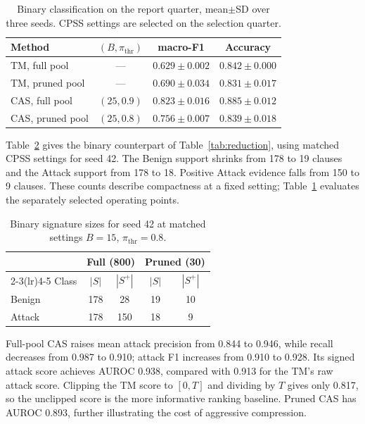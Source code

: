 \documentclass[conference]{IEEEtran}
\begin{document}
\begin{table}[!htb]
\color{blue}
\centering
\caption{Binary classification on the report quarter, mean$\pm$SD
over three seeds. CPSS settings are selected on the selection quarter.}
\label{tab:binary}
\footnotesize
\setlength{\tabcolsep}{3pt}
\begin{tabular}{@{}lccc@{}}
\toprule
Method & $(B,\pi_{\mathrm{thr}})$ & macro-F1 & Accuracy \\
\midrule
TM, full pool & --- & $0.629\pm0.002$ & $0.842\pm0.000$ \\
TM, pruned pool & --- & $0.690\pm0.034$ & $0.831\pm0.017$ \\
CAS, full pool & $(25,0.9)$ & $\mathbf{0.823\pm0.016}$ & $\mathbf{0.885\pm0.012}$ \\
CAS, pruned pool & $(25,0.8)$ & $0.756\pm0.007$ & $0.839\pm0.018$ \\
\bottomrule
\end{tabular}
\end{table}

Table~\ref{tab:binary-reduction} gives the binary counterpart of
Table~\ref{tab:reduction}, using matched CPSS settings for seed 42.
The Benign support shrinks from 178 to 19 clauses and the Attack
support from 178 to 18. Positive Attack evidence falls from 150 to
9 clauses. These counts describe compactness at a fixed setting;
Table~\ref{tab:binary} evaluates the separately selected operating points.

\begin{table}[!htb]
\color{blue}
\centering
\caption{Binary signature sizes for seed 42 at matched settings
$B=15$, $\pi_{\mathrm{thr}}=0.8$.}
\label{tab:binary-reduction}
\footnotesize
\begin{tabular}{@{}lcccc@{}}
\toprule
& \multicolumn{2}{c}{Full (800)} & \multicolumn{2}{c}{Pruned (30)} \\
\cmidrule(lr){2-3}\cmidrule(lr){4-5}
Class & $|S|$ & $|S^+|$ & $|S|$ & $|S^+|$ \\
\midrule
Benign & 178 & 28 & 19 & 10 \\
Attack & 178 & 150 & 18 & 9 \\
\bottomrule
\end{tabular}
\end{table}

Full-pool CAS raises mean attack precision from 0.844 to 0.946,
while recall decreases from 0.987 to 0.910; attack F1 increases from
0.910 to 0.928. Its signed attack score achieves AUROC 0.938,
compared with 0.913 for the TM's raw attack score. Clipping the TM
score to $[0,T]$ and dividing by $T$ gives only 0.817, so the
unclipped score is the more informative ranking baseline. Pruned CAS
has AUROC 0.893, further illustrating the cost of aggressive compression.
\end{document}
